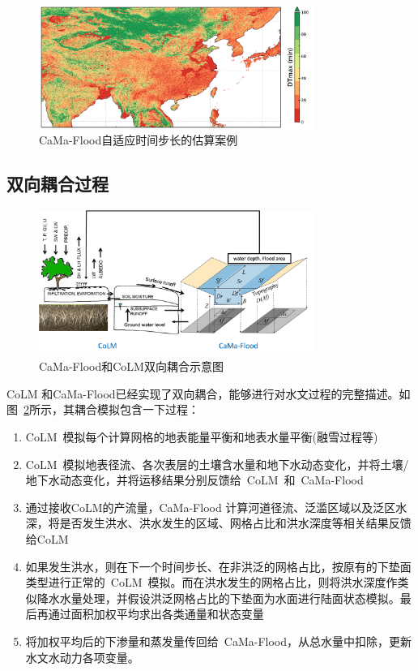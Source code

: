 {
  \begin{figure}[htbp]
    \centering
    \includegraphics[width=0.8\textwidth]{Figures/陆地表面的水分循环/自适应时间步长的估算.png}
    \caption{CaMa-Flood自适应时间步长的估算案例}
    \label{fig:自适应时间步长的估算}
  \end{figure}
}
\subsection{双向耦合过程}
{
  \begin{figure}[htbp]
    \centering
    \includegraphics[width=0.8\textwidth]{Figures/陆地表面的水分循环/双向耦合.png}
    \caption{CaMa-Flood和CoLM双向耦合示意图}
    \label{fig:双向耦合}
  \end{figure}
}

CoLM 和CaMa-Flood已经实现了双向耦合，能够进行对水文过程的完整描述。如图~\ref{fig:双向耦合}所示，其耦合模拟包含一下过程：
\begin{enumerate}
  \item CoLM~模拟每个计算网格的地表能量平衡和地表水量平衡(融雪过程等)
  \item CoLM~模拟地表径流、各次表层的土壤含水量和地下水动态变化，并将土壤/地下水动态变化，并将运移结果分别反馈给~CoLM~和~CaMa-Flood~
  \item 通过接收CoLM的产流量，CaMa-Flood 计算河道径流、泛滥区域以及泛区水深，将是否发生洪水、洪水发生的区域、网格占比和洪水深度等相关结果反馈给CoLM
  \item 如果发生洪水，则在下一个时间步长、在非洪泛的网格占比，按原有的下垫面类型进行正常的~CoLM~模拟。而在洪水发生的网格占比，则将洪水深度作类似降水水量处理，并假设洪泛网格占比的下垫面为水面进行陆面状态模拟。最后再通过面积加权平均求出各类通量和状态变量
  \item 将加权平均后的下渗量和蒸发量传回给~CaMa-Flood，从总水量中扣除，更新水文水动力各项变量。

\end{enumerate}
